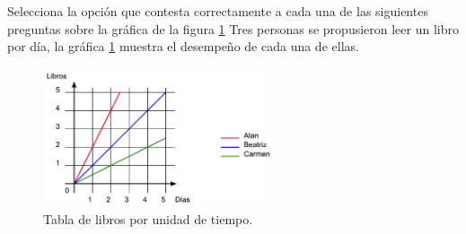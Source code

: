 \question[20] Selecciona la opci\'on que contesta correctamente
a cada una de las siguientes preguntas sobre la gr\'afica de la figura \ref{fig:SINMAT1_U3_AC74_IMG1}
Tres personas se propusieron leer un libro por día, la gráfica \ref{fig:SINMAT1_U3_AC74_IMG1} muestra el desempeño de cada una de ellas.
\begin{figure}[H]
    \centering
    \includegraphics[width=0.6\textwidth]{../images/SINMAT1_U3_AC74_IMG1}
    \caption{Tabla de libros por unidad de tiempo.}
    \label{fig:SINMAT1_U3_AC74_IMG1}
\end{figure}
\begin{parts}
    
    
    
    
    
    
    
\end{parts}